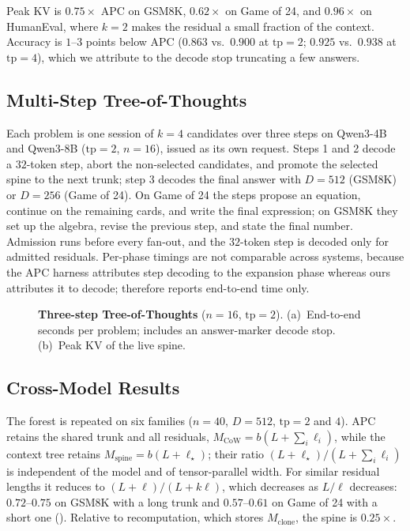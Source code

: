 Peak KV is $0.75\times$ APC on GSM8K, $0.62\times$ on Game of 24, and $0.96\times$ on HumanEval, where $k{=}2$ makes the residual a small fraction of the context.
Accuracy is $1$--$3$ points below APC ($0.863$ vs.\ $0.900$ at $\mathrm{tp}{=}2$; $0.925$ vs.\ $0.938$ at $\mathrm{tp}{=}4$), which we attribute to the decode stop truncating a few answers.

\subsection{Multi-Step Tree-of-Thoughts}
\label{sec:eval-mt}

Each problem is one session of $k{=}4$ candidates over three steps on Qwen3-4B and Qwen3-8B ($\mathrm{tp}{=}2$, $n{=}16$), issued as its own request.
Steps 1 and 2 decode a $32$-token step, abort the non-selected candidates, and promote the selected spine to the next trunk; step 3 decodes the final answer with $D{=}512$ (GSM8K) or $D{=}256$ (Game of 24).
On Game of 24 the steps propose an equation, continue on the remaining cards, and write the final expression; on GSM8K they set up the algebra, revise the previous step, and state the final number.
Admission runs before every fan-out, and the $32$-token step is decoded only for admitted residuals.
Per-phase timings are not comparable across systems, because the APC harness attributes step decoding to the expansion phase whereas ours attributes it to decode;  therefore reports end-to-end time only.

\begin{figure}[t]
\centering
\resizebox{\columnwidth}{!}{}
\caption{\textbf{Three-step Tree-of-Thoughts} ($n{=}16$, $\mathrm{tp}{=}2$).
(a)~End-to-end seconds per problem; \sys includes an answer-marker decode stop.
(b)~Peak KV of the live spine.}
\label{fig:eval-mt}
\end{figure}

\subsection{Cross-Model Results}
\label{sec:eval-multi}

The forest is repeated on six families ($n{=}40$, $D{=}512$, $\mathrm{tp}{=}2$ and $4$).
APC retains the shared trunk and all residuals, $M_{\mathrm{CoW}}=b(L+\sum_i\ell_i)$, while the context tree retains $M_{\mathrm{spine}}=b(L+\ell_\star)$; their ratio $(L+\ell_\star)/(L+\sum_i\ell_i)$ is independent of the model and of tensor-parallel width.
For similar residual lengths it reduces to $(L+\ell)/(L+k\ell)$, which decreases as $L/\ell$ decreases: $0.72$--$0.75$ on GSM8K with a long trunk and $0.57$--$0.61$ on Game of 24 with a short one ().
Relative to recomputation, which stores $M_{\mathrm{clone}}$, the spine is $0.25\times$.

